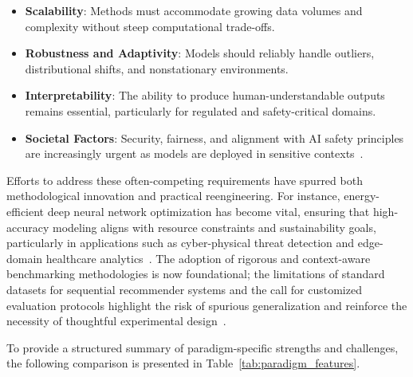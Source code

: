 \documentclass[sigconf]{acmart}
\begin{document}
\begin{itemize}
    \item \textbf{Scalability}: Methods must accommodate growing data volumes and complexity without steep computational trade-offs.
    \item \textbf{Robustness and Adaptivity}: Models should reliably handle outliers, distributional shifts, and nonstationary environments.
    \item \textbf{Interpretability}: The ability to produce human-understandable outputs remains essential, particularly for regulated and safety-critical domains.
    \item \textbf{Societal Factors}: Security, fairness, and alignment with AI safety principles are increasingly urgent as models are deployed in sensitive contexts~\cite{ref79,ref85}.
\end{itemize}

Efforts to address these often-competing requirements have spurred both methodological innovation and practical reengineering. For instance, energy-efficient deep neural network optimization has become vital, ensuring that high-accuracy modeling aligns with resource constraints and sustainability goals, particularly in applications such as cyber-physical threat detection and edge-domain healthcare analytics~\cite{ref61}. The adoption of rigorous and context-aware benchmarking methodologies is now foundational; the limitations of standard datasets for sequential recommender systems and the call for customized evaluation protocols highlight the risk of spurious generalization and reinforce the necessity of thoughtful experimental design~\cite{ref73,ref87}.

To provide a structured summary of paradigm-specific strengths and challenges, the following comparison is presented in Table~\ref{tab:paradigm_features}.
\end{document}
